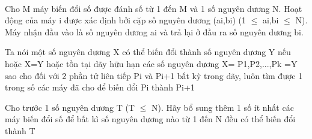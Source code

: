  

Cho M máy biến đổi số được đánh số từ 1 đến M và 1 số nguyên dương N. Hoạt động của máy i được xác định bởi cặp số nguyên dương (ai,bi) (1 $\le$ ai,bi $\le$ N). Máy nhận đầu vào là số nguyên dương ai và trả lại ở đầu ra số nguyên dương bi.

Ta nói một số nguyên dương X có thể biến đổi thành số nguyên dương Y nếu hoặc X=Y hoặc tồn tại dãy hữu hạn các số nguyên dương X= P1,P2,...,Pk =Y sao cho đối với 2 phần tử liên tiếp Pi và Pi+1 bất kỳ trong dãy, luôn tìm được 1 trong số các máy đã cho để biến đổi Pi thành Pi+1

Cho trước 1 số nguyên dương T (T  $\le$  N). Hãy bổ sung thêm 1 số ít nhất các máy biến đổi số để bất kì số nguyên dương nào từ 1 đến N đều có thể biến đổi thành T

\